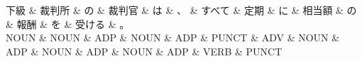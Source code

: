 \documentclass[tikz,border=5pt]{standalone}
\begin{document}
\normalsize
\begin{dependency}[edge unit distance=12.0pt]
    \begin{deptext}[column sep=1em]
        下級 \& 裁判所 \& の \& 裁判官 \& は \& 、 \& すべて \& 定期 \& に \& 相当額 \& の \& 報酬 \& を \& 受ける \& 。\\
        NOUN \& NOUN \& ADP \& NOUN \& ADP \& PUNCT \& ADV \& NOUN \& ADP \& NOUN \& ADP \& NOUN \& ADP \& VERB \& PUNCT\\
    \end{deptext}
\end{dependency}
\end{document}
